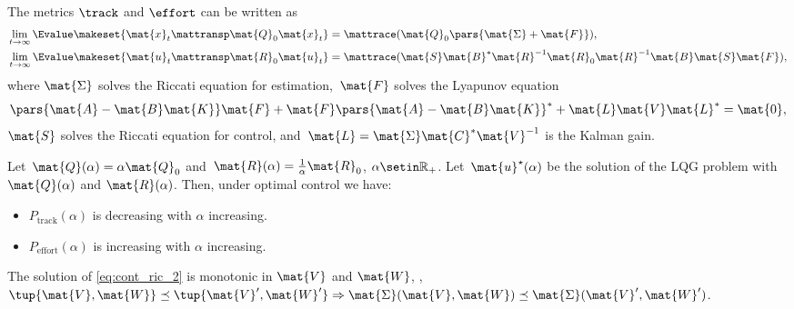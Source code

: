 {\begin{forslides}
        \begin{lemma}
            \label{lem:precision}
            The metrics $\track$ and $\effort$ can be written as
            \begin{equation}
                \begin{aligned}
                    \lim_{t\to \infty}\Evalue\makeset{ \mat{x}_t\mattransp \mat{Q}_0\mat{x}_t} & =\mattrace(\mat{Q}_0\pars{ \mat{\Sigma} +\mat{F}}), \\
                    \lim_{t\to \infty}\Evalue\makeset{ \mat{u}_t\mattransp \mat{R}_0\mat{u}_t} & =\mattrace(\mat{S}\mat{B}^*\mat{R}^{-1}\mat{R}_0\mat{R}^{-1}\mat{B}\mat{S}\mat{F}),
                \end{aligned}
            \end{equation}
            where
            $\mat{\Sigma}$ solves the Riccati equation for estimation,~$\mat{F}$ solves the Lyapunov equation
            \begin{equation}
                \label{eq:lyapct}
                \pars{ \mat{A}-\mat{B}\mat{K}}\mat{F}+\mat{F}\pars{\mat{A}-\mat{B}\mat{K}}^*+\mat{L}\mat{V}\mat{L}^*=\mat{0},
            \end{equation}
            $\mat{S}$ solves the Riccati equation for control, and~$\mat{L}=\mat{\Sigma}\mat{C}^*\mat{V}^{-1}$ is the Kalman gain.
        \end{lemma}

        \begin{lemma}
            \label{lem:codesigncnt_1}
            Let~$\mat{Q}(\alpha)=\alpha \mat{Q}_0$ and~$\mat{R}(\alpha)=\frac{1}{\alpha}\mat{R}_0$, $\alpha\setin \mathbb{R}_+$.
            Let~$\mat{u}^\star(\alpha)$ be the solution of the LQG problem with $\mat{Q}(\alpha)$ and $\mat{R}(\alpha)$.
            Then, under optimal control we have:
            \begin{itemize}
                \item $P_\mathrm{track}(\alpha)$ is decreasing with $\alpha$
                      increasing.
                \item $P_\mathrm{effort}(\alpha)$ is increasing with $\alpha$ increasing.
            \end{itemize}
        \end{lemma}

        \begin{lemma}
            \label{lem:cont_V_W}
            The solution of \cref{eq:cont_ric_2} is monotonic in $\mat{V}$ and $\mat{W}$, \ie, $\tup{\mat{V},\mat{W}}\preceq \tup{\mat{V}',\mat{W}'} \Rightarrow \mat{\Sigma}(\mat{V},\mat{W})\preceq \mat{\Sigma}(\mat{V}',\mat{W}')$.
        \end{lemma}


\end{forslides}}
